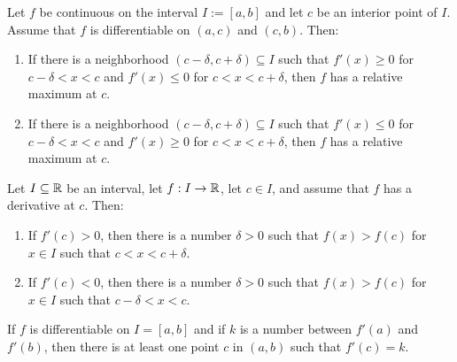 \begin{theorem}
	Let $f$ be continuous on the interval $I:=[a,b]$ and let $c$ be an interior point of $I$. Assume that $f$ is differentiable on $(a,c)$ and $(c,b)$. Then:
	\begin{enumerate}
		\item If there is a neighborhood $(c-\delta, c+\delta)\subseteq I$ such that $f'(x) \geq 0$ for $c-\delta< x < c$ and $f'(x) \leq 0$ for $c < x < c + \delta$, then $f$ has a relative maximum at $c$.

		\item If there is a neighborhood $(c-\delta, c+\delta) \subseteq I$ such that $f'(x) \leq 0$ for $c-\delta < x < c$ and $f'(x) \geq 0$ for $c < x < c+\delta$, then $f$ has a relative maximum at $c$.
	\end{enumerate}
\end{theorem}

\begin{lemma}
	Let $I \subseteq \mathbb{R}$ be an interval, let $f:I \rightarrow \mathbb{R}$, let $c \in I$, and assume that $f$ has a derivative at $c$. Then:
	\begin{enumerate}
		\item If $f'(c) >0$, then there is a number $\delta > 0$ such that $f(x) > f(c)$ for $x \in I$ such that $c < x < c+ \delta$.

		\item If $f'(c)<0$, then there is a number $\delta >0$ such that $f(x) > f(c)$ for $x \in I$ such that $c-\delta < x < c$.
	\end{enumerate}
\end{lemma}

\begin{theorem}
	If $f$ is differentiable on $I = [a,b]$ and if $k$ is a number between $f'(a)$ and $f'(b)$, then there is at least one point $c$ in $(a,b)$ such that $f'(c)=k$.
\end{theorem}
